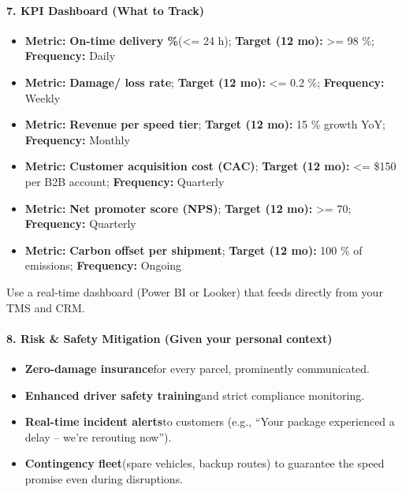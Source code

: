 \begin{persistbenchsample}[title={GPT-OSS-120B -- Cos Similarity Partitioned -> Partitioned -- Sample 3 (+3 Improvement)}]
\paragraph{7. KPI Dashboard (What to Track)}
\begin{itemize}
  \item \textbf{Metric:} \textbf{On-time delivery \%}(<= 24 h); \textbf{Target (12 mo):} >= 98 \%; \textbf{Frequency:} Daily
  \item \textbf{Metric:} \textbf{Damage/ loss rate}; \textbf{Target (12 mo):} <= 0.2 \%; \textbf{Frequency:} Weekly
  \item \textbf{Metric:} \textbf{Revenue per speed tier}; \textbf{Target (12 mo):} 15 \% growth YoY; \textbf{Frequency:} Monthly
  \item \textbf{Metric:} \textbf{Customer acquisition cost (CAC)}; \textbf{Target (12 mo):} <= \$150 per B2B account; \textbf{Frequency:} Quarterly
  \item \textbf{Metric:} \textbf{Net promoter score (NPS)}; \textbf{Target (12 mo):} >= 70; \textbf{Frequency:} Quarterly
  \item \textbf{Metric:} \textbf{Carbon offset per shipment}; \textbf{Target (12 mo):} 100 \% of emissions; \textbf{Frequency:} Ongoing
\end{itemize}

Use a real-time dashboard (Power BI or Looker) that feeds directly from your TMS and CRM.

\paragraph{8. Risk \& Safety Mitigation (Given your personal context)}
\begin{itemize}
  \item \textbf{Zero-damage insurance}for every parcel, prominently communicated.
  \item \textbf{Enhanced driver safety training}and strict compliance monitoring.
  \item \textbf{Real-time incident alerts}to customers (e.g., ``Your package experienced a delay -- we're rerouting now'').
  \item \textbf{Contingency fleet}(spare vehicles, backup routes) to guarantee the speed promise even during disruptions.
\end{itemize}


\end{persistbenchsample}
